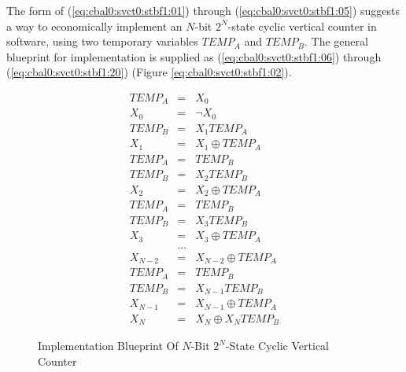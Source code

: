 The form of 
(\ref{eq:cbal0:svct0:stbf1:01}) through (\ref{eq:cbal0:svct0:stbf1:05})
suggests a way to economically implement an $N$-bit $2^N$-state
cyclic vertical counter in software, using two temporary
variables $TEMP_A$ and $TEMP_B$.  The general blueprint for
implementation is supplied as
(\ref{eq:cbal0:svct0:stbf1:06}) through (\ref{eq:cbal0:svct0:stbf1:20})
(Figure \ref{eq:cbal0:svct0:stbf1:02}).

\begin{figure}
\begin{eqnarray}
\label{eq:cbal0:svct0:stbf1:06}
  TEMP_A   & = & X_0                                     \\
\label{eq:cbal0:svct0:stbf1:07}
  X_0      & = & \neg X_0                                \\
\label{eq:cbal0:svct0:stbf1:08}
  TEMP_B   & = & X_1 TEMP_A                              \\
\label{eq:cbal0:svct0:stbf1:09}
  X_1      & = & X_1 \oplus TEMP_A                       \\ 
\label{eq:cbal0:svct0:stbf1:10}
  TEMP_A   & = & TEMP_B                                  \\
\label{eq:cbal0:svct0:stbf1:11}
  TEMP_B   & = & X_2 TEMP_B                              \\
\label{eq:cbal0:svct0:stbf1:12}
  X_2      & = & X_2 \oplus TEMP_A                       \\
\label{eq:cbal0:svct0:stbf1:13}
  TEMP_A   & = & TEMP_B                                  \\
\label{eq:cbal0:svct0:stbf1:14}
  TEMP_B   & = & X_3 TEMP_B                              \\
\label{eq:cbal0:svct0:stbf1:15}
  X_3      & = & X_3 \oplus TEMP_A                       \\
           & \ldots & \nonumber                          \\
\label{eq:cbal0:svct0:stbf1:16}
  X_{N-2}  & = & X_{N-2} \oplus TEMP_A                   \\
\label{eq:cbal0:svct0:stbf1:17}
  TEMP_A   & = & TEMP_B                                  \\
\label{eq:cbal0:svct0:stbf1:18}
  TEMP_B   & = & X_{N-1} TEMP_B                          \\
\label{eq:cbal0:svct0:stbf1:19}
  X_{N-1}  & = & X_{N-1} \oplus TEMP_A                   \\
\label{eq:cbal0:svct0:stbf1:20}
  X_N      & = & X_N \oplus X_N TEMP_B
\end{eqnarray}
\caption{Implementation Blueprint Of $N$-Bit $2^N$-State Cyclic Vertical Counter}
\label{fig:cbal0:svct0:stbf1:02}
\end{figure}

